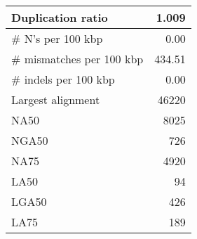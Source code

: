 \documentclass[12pt,a4paper]{article}
\begin{document}
\begin{table}[ht]
\begin{center}
\begin{tabular}{|l*{1}{|r}|}
Duplication ratio & 1.009 \\ \hline
\# N's per 100 kbp & 0.00 \\ \hline
\# mismatches per 100 kbp & 434.51 \\ \hline
\# indels per 100 kbp & 0.00 \\ \hline
Largest alignment & 46220 \\ \hline
NA50 & 8025 \\ \hline
NGA50 & 726 \\ \hline
NA75 & 4920 \\ \hline
LA50 & 94 \\ \hline
LGA50 & 426 \\ \hline
LA75 & 189 \\ \hline
\end{tabular}
\end{center}
\end{table}
\end{document}
